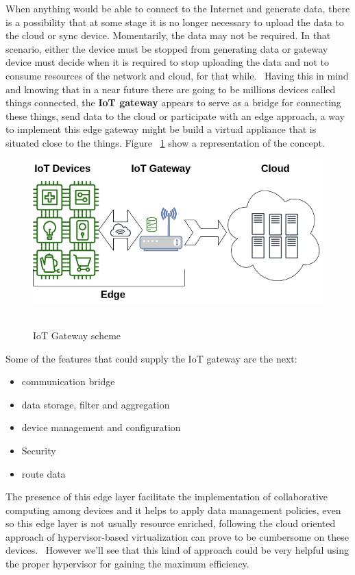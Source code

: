 When anything would be able to connect to the Internet and generate data, there is a possibility that at some stage it is no longer necessary to upload the data to the cloud or sync device. Momentarily, the data may not be required. In that scenario, either the device must be stopped from generating data or gateway device must decide when it is required to stop uploading the data and not to consume resources of the network and cloud, for that while.~\cite{Ficloud:AazaamHuh:2014}
Having this in mind and knowing that in a near future there are going to be millions devices called things connected, the \textbf{IoT gateway} appears to serve as a bridge for connecting these things, send data to the cloud or participate with an edge approach, a way to implement this edge gateway might be build a virtual appliance that is situated close to the things. Figure ~\ref{figure1.1} show a representation of the concept.


\newpage
\begin{figure}[h]%
    \includegraphics[width=6.5in]{figures/iot_gateway.png}
~\caption{IoT Gateway scheme}
\label{figure1.1}
\end{figure}

Some of the features that could supply the IoT gateway are the next:

\begin{itemize}
  \item communication bridge
  \item data storage, filter and aggregation
  \item device management and configuration
  \item Security 
  \item route data
\end{itemize}

The presence of this edge layer facilitate the implementation of collaborative computing among devices and it helps to apply data management policies, even so this edge layer is not usually resource enriched, following the cloud oriented approach of hypervisor-based virtualization can prove to be cumbersome on these devices.~\cite{arxiv:doluikiraly:2018}
However we'll see that this kind of approach could be very helpful using the proper hypervisor for gaining the maximum efficiency.

